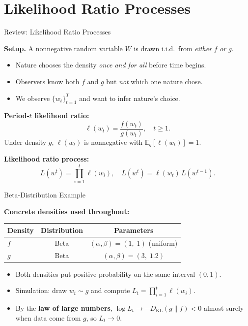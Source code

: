 \documentclass[aspectratio=169,12pt]{beamer}
\newcommand{\E}{\mathbb{E}}
\newcommand{\DKL}{D_{\mathrm{KL}}}
\begin{document}
\section{Likelihood Ratio Processes}

\begin{frame}{Review: Likelihood Ratio Processes}

\textbf{Setup.} A nonnegative random variable $W$ is drawn i.i.d.\ from
\emph{either} $f$ \emph{or} $g$.

\begin{itemize}
  \item Nature chooses the density \emph{once and for all} before time begins.
  \item Observers know both $f$ and $g$ but \emph{not} which one nature chose.
  \item We observe $\{w_t\}_{t=1}^{T}$ and want to infer nature's choice.
\end{itemize}

\bigskip
\textbf{Period-$t$ likelihood ratio:}
\[
  \ell(w_t)=\frac{f(w_t)}{g(w_t)}, \quad t\geq 1.
\]
Under density $g$, $\ell(w_t)$ is nonnegative with $\E_g[\ell(w_t)]=1$.

\bigskip
\textbf{Likelihood ratio process:}
\[
  L(w^t) = \prod_{i=1}^{t} \ell(w_i), \quad
  L(w^t) = \ell(w_t)\,L(w^{t-1}).
\]

\end{frame}

\begin{frame}{Beta-Distribution Example}

\textbf{Concrete densities used throughout:}

\begin{center}
\renewcommand{\arraystretch}{1.3}
\begin{tabular}{lcc}
\toprule
Density & Distribution & Parameters \\
\midrule
$f$ & Beta & $(\alpha,\beta)=(1,\;1)$ \quad (uniform) \\
$g$ & Beta & $(\alpha,\beta)=(3,\;1.2)$ \\
\bottomrule
\end{tabular}
\end{center}

\bigskip
\begin{itemize}
  \item Both densities put positive probability on the same interval $(0,1)$.
  \item Simulation: draw $w_t \sim g$ and compute $L_t = \prod_{i=1}^t \ell(w_i)$.
  \item By the \textbf{law of large numbers}, $\log L_t \to -\DKL(g\|f)<0$
        almost surely when data come from $g$, so $L_t \to 0$.
\end{itemize}

\end{frame}
\end{document}
